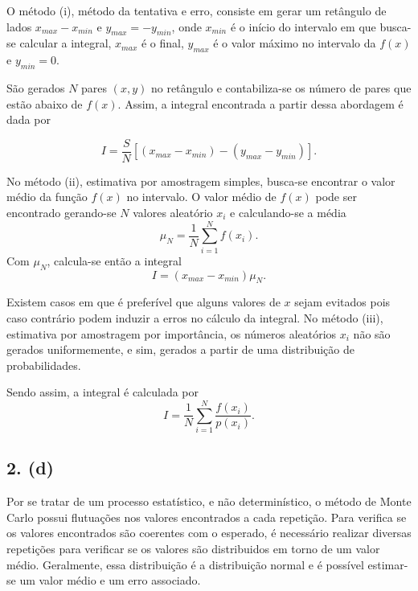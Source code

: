 \documentclass[brazilian, 12pt, a4paper, final]{article}
\begin{document}
O método (i), método da tentativa e erro, consiste em gerar um retângulo de lados $x_{max}-x_{min}$ e $y_{max}=-y_{min}$, onde $x_{min}$ é o início do intervalo em que busca-se calcular a integral, $x_{max}$ é o final, $y_{max}$ é o valor máximo no intervalo  da $f(x)$ e $y_{min}=0$. 

São gerados $N$ pares $(x,y)$ no retângulo e contabiliza-se os número de pares que estão abaixo de $f(x)$. Assim, a integral encontrada a partir dessa abordagem é dada por

\begin{equation}
	I=\frac{S}{N}[(x_{max}-x_{min})-(y_{max}-y_{min})].
\end{equation}

No método (ii), estimativa por amostragem simples, busca-se encontrar o valor médio da função $f(x)$ no intervalo. O valor médio de $f(x)$ pode ser encontrado gerando-se $N$ valores aleatório $x_i$ e calculando-se a média
\begin{equation}
	\mu_N=\frac{1}{N}\sum_{i=1}^{N}f(x_i). 
\end{equation}
Com $\mu_N$, calcula-se então a integral 
\begin{equation}
	I=(x_{max}-x_{min})\mu_N.
\end{equation}

Existem casos em que é preferível que alguns valores de $x$ sejam evitados pois caso contrário podem induzir a erros no cálculo da integral. No método (iii), estimativa por amostragem por importância, os números aleatórios $x_i$ não são gerados uniformemente, e sim, gerados a partir de uma distribuição de probabilidades. 

Sendo assim, a  integral é calculada por
\begin{equation}
	I=\frac{1}{N}\sum_{i=1}^{N}\frac{f(x_i)}{p(x_i)}.
\end{equation}
 
\subsection*{2. (d)}
Por se tratar de um processo estatístico, e não determinístico, o método de Monte Carlo possui flutuações nos valores encontrados a cada repetição. Para verifica se os valores encontrados são coerentes com o esperado, é necessário realizar diversas repetições para verificar se os valores são distribuidos em torno de um valor médio. Geralmente, essa distribuição é a distribuição normal e é possível estimar-se um valor médio e um erro associado.
\end{document}
